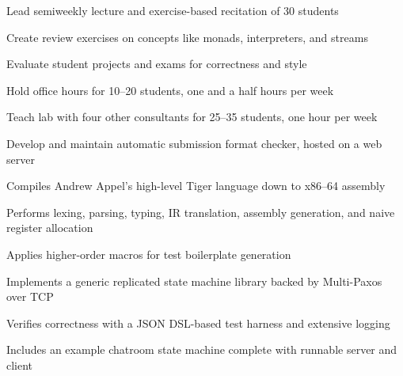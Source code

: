 \documentclass{resume}
\begin{document}
\begin{work experience}
    \begin{description}
        \item Lead semiweekly lecture and exercise-based recitation of 30 students
        \item Create review exercises on concepts like monads, interpreters, and streams
        \item Evaluate student projects and exams for correctness and style
    \end{description}

    \begin{description}
        \item Hold office hours for 10--20 students, one and a half hours per week
        \item Teach lab with four other consultants for 25--35 students, one hour per week
        \item Develop and maintain automatic submission format checker, hosted on a web server
    \end{description}
\end{work experience}

\begin{projects}
    \begin{description}
        \item Compiles Andrew Appel's high-level Tiger language down to x86--64 assembly
        \item Performs lexing, parsing, typing, IR translation, assembly generation, and naive register allocation
        \item Applies higher-order macros for test boilerplate generation
    \end{description}

    \begin{description}
        \item Implements a generic replicated state machine library backed by Multi-Paxos over TCP
        \item Verifies correctness with a JSON DSL-based test harness and extensive logging
        \item Includes an example chatroom state machine complete with runnable server and client
    \end{description}
\end{projects}
\end{document}
